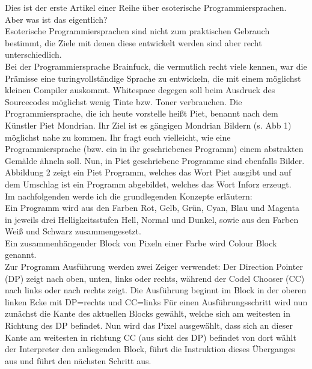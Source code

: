 {Dies ist der erste Artikel einer Reihe über esoterische Programmiersprachen.\\
    Aber was ist das eigentlich?\\
    Esoterische
    Programmiersprachen sind nicht zum praktischen Gebrauch bestimmt, die Ziele
    mit denen diese entwickelt werden sind aber recht unterschiedlich.\\
    Bei der
    Programmiersprache \glqq{}Brainfuck\grqq{}, die vermutlich recht viele kennen, war die Prämisse
    eine turingvollständige Sprache zu entwickeln, die mit einem möglichst kleinen
    Compiler auskommt. \glqq{}Whitespace\grqq{} degegen soll beim Ausdruck des
    Sourcecodes möglichst wenig Tinte bzw. Toner verbrauchen.}
{Die Programmiersprache, die ich heute vorstelle heißt \glqq{}Piet\grqq{}, benannt nach dem
    Künstler Piet Mondrian. Ihr Ziel ist es gängigen Mondrian Bildern (s.
    Abb 1) möglichst nahe zu kommen.
    Ihr fragt euch vielleicht, wie eine Programmiersprache (bzw. ein in ihr geschriebenes Programm) einem abstrakten
    Gemälde ähneln soll.
    Nun, in Piet geschriebene Programme sind ebenfalls Bilder.
    Abbildung 2 zeigt ein Piet Programm, welches das Wort \glqq{}Piet\grqq{} ausgibt und auf
    dem Umschlag ist ein Programm abgebildet, welches das Wort \glqq{}Inforz\grqq{}
    erzeugt.
    ~\\

    Im nachfolgenden werde ich die grundlegenden Konzepte erläutern:\\

    Ein Programm wird aus den Farben Rot, Gelb, Grün, Cyan, Blau und Magenta
    in jeweils drei Helligkeitsstufen Hell, Normal und Dunkel, sowie aus den
    Farben Weiß und Schwarz zusammengesetzt.\\

    Ein zusammenhängender Block von Pixeln einer Farbe wird \glqq{}Colour Block\grqq{}
    genannt.\\

    Zur Programm Ausführung werden zwei Zeiger verwendet: Der \glqq{}Direction Pointer\grqq{}
    (DP)
    zeigt nach oben, unten, links oder rechts, während der \glqq{}Codel Chooser\grqq{} (CC) nach
    links oder nach rechts zeigt.
    Die Ausführung beginnt im Block in der oberen linken Ecke mit DP=rechts und
    CC=links
    Für einen Ausführungsschritt wird nun zunächst die Kante des aktuellen
    Blocks gewählt, welche sich am weitesten in Richtung des DP befindet.
    Nun wird das Pixel ausgewählt, dass sich an dieser Kante am weitesten in
    richtung CC (\grqq{}aus sicht des DP\grqq{}) befindet von dort wählt der Interpreter den
    anliegenden Block, führt die Instruktion dieses Überganges aus und führt den
    nächsten Schritt aus.\\

}
